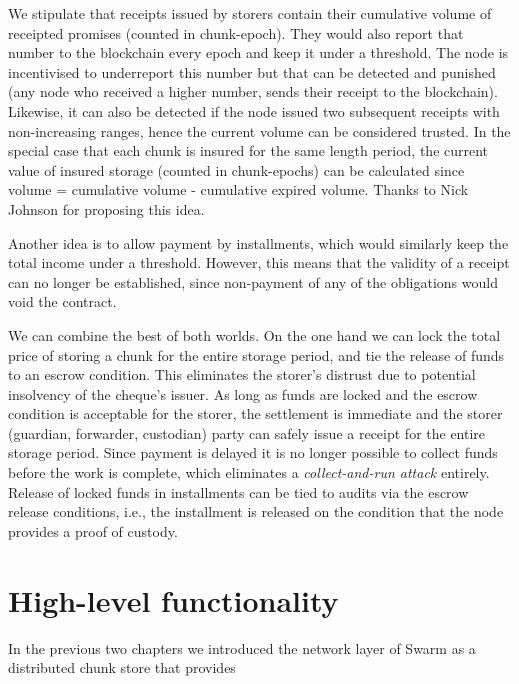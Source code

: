 We stipulate that receipts issued by storers contain their cumulative volume of receipted promises (counted in chunk-epoch). They would also report that number to the blockchain every epoch and keep it under a threshold. The node is incentivised to underreport this number but that can be detected and punished (any node who received a higher number, sends their receipt to the blockchain). Likewise, it can also be detected if the node issued two subsequent receipts with non-increasing ranges, hence the current volume can be considered trusted. In the special case that each chunk is insured for the same length period, the current value of insured storage (counted in chunk-epochs) can be calculated since volume = cumulative volume - cumulative expired volume. Thanks to Nick Johnson for proposing this idea.

Another idea is to allow payment by installments, which would similarly keep the total income under a threshold. However, this means that the validity of a receipt can no longer be established, since non-payment of any of the obligations would void the contract.

We can combine the best of both worlds. On the one hand we can lock the total price of storing a chunk for the entire storage period, and tie the release of funds to an escrow condition. This eliminates the storer's distrust due to potential insolvency of the cheque's issuer.
As long as funds are locked and the escrow condition is acceptable for the storer, the settlement is immediate and the storer (guardian, forwarder, custodian) party can safely issue a receipt for the entire storage period.
Since payment is delayed it is no longer possible to collect funds before the work is complete, which eliminates a \emph{collect-and-run attack} entirely.
Release of locked funds in installments can be tied to audits via the escrow release conditions, i.e., the installment is released on the condition that the node provides a proof of custody.


\chapter{High-level functionality}\label{sec:high-level-functionality}

In the previous two chapters we introduced the network layer of Swarm as a distributed chunk store that provides 

